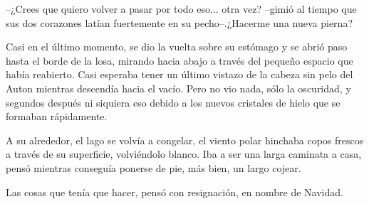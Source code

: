 --¿Crees que quiero volver a pasar por todo eso... otra vez? --gimió al tiempo que sus dos corazones latían fuertemente en su pecho--.¿Hacerme una nueva pierna?
 
Casi en el último momento, se dio la vuelta sobre su estómago y se abrió paso hasta el borde de la losa, mirando hacia abajo a través del pequeño espacio que había reabierto. Casi esperaba tener un último vistazo de la cabeza sin pelo del Auton mientras descendía hacia el vacío. Pero no vio nada, sólo la oscuridad, y segundos después ni siquiera eso debido a los nuevos cristales de hielo que se formaban rápidamente.
 
A su alrededor, el lago se volvía a congelar, el viento polar hinchaba copos frescos a través de su superficie, volviéndolo blanco. Iba a ser una larga caminata a casa, pensó mientras conseguía ponerse de pie, más bien, un largo cojear.
 
Las cosas que tenía que hacer, pensó con resignación, en nombre de Navidad.
